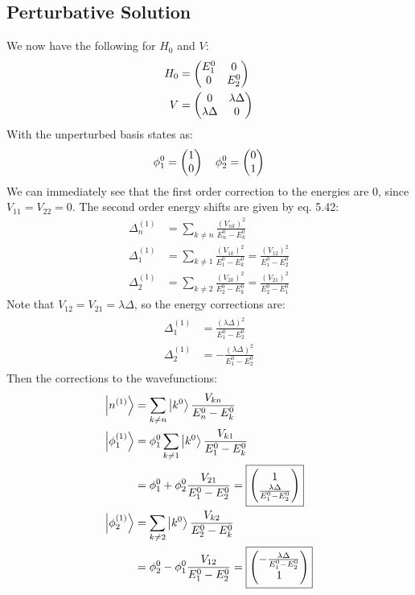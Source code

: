 \documentclass[12pt]{article}
\begin{document}
\subsection{Perturbative Solution}
We now have the following for $H_0$ and $V$:
\begin{align*}
  H_0&=\pmqty{\dmat[0]{E_1^0,E_2^0}}\\
  V&=\pmqty{0&\lambda\Delta\\\lambda\Delta&0}
\end{align*}
With the unperturbed basis states as:
\begin{align*}
  \phi_1^{0}=\pmqty{1\\0}\quad\phi_2^{0}=\pmqty{0\\1}
\end{align*}
We can immediately see that the first order correction to the energies are $0$, since $V_{11}=V_{22}=0$. The second order energy shifts are given by eq. 5.42:
\begin{align*}
  \Delta_n^{(1)}&=\sum_{k\neq n}\frac{(V_{nk})^2}{E_{n}^0-E_k^0}\\
  \Delta_1^{(1)}&=\sum_{k\neq 1}\frac{(V_{1k})^2}{E_{1}^0-E_k^0}
  =\frac{(V_{12})^2}{E_{1}^0-E_2^0}\\
  \Delta_2^{(1)}&=\sum_{k\neq 2}\frac{(V_{2k})^2}{E_{2}^0-E_k^0}
  =\frac{(V_{21})^2}{E_{2}^0-E_1^0}
\end{align*}
Note that $V_{12}=V_{21}=\lambda\Delta$, so the energy corrections are:
\begin{align}
  \boxed{\begin{aligned}
    \Delta_1^{(1)}&=\frac{(\lambda\Delta)^2}{E_1^0-E_2^0}\\
    \Delta_2^{(1)}&=-\frac{(\lambda\Delta)^2}{E_1^0-E_2^0}
  \end{aligned}}
\end{align}
Then the corrections to the wavefunctions:
\begin{align}
  \ket{n^{(1)}}&=\sum_{k\neq n}\ket{k^{0}}\frac{V_{kn}}{E_{n}^0-E_k^0}\notag\\
  \ket{\phi_1^{(1)}}&=\phi_1^0\notag
  \sum_{k\neq 1}\ket{k^{0}}\frac{V_{k1}}{E_1^0-E_k^0}\\
  &=\phi_1^0+\phi_2^0\frac{V_{21}}{E_1^0-E_2^0}=
  \boxed{\pmqty{1\\\frac{\lambda\Delta}{E_1^0-E_2^0}}}\\
  \ket{\phi_2^{(1)}}&=\sum_{k\neq 2}\ket{k^{0}}\frac{V_{k2}}{E_2^0-E_k^0}\notag\\
  &=\phi_2^0-\phi_1^0\frac{V_{12}}{E_1^0-E_2^0}=
  \boxed{\pmqty{-\frac{\lambda\Delta}{E_1^0-E_2^0}\\1}}
\end{align}
\end{document}
